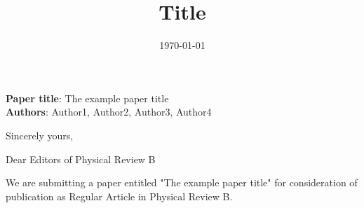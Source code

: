 \documentclass[12pt,a4paper, roman]{moderncv}
\title{Title}                               %
\begin{document}
\date{\today}
\opening{\textbf{Paper title}: The example paper title \\
\textbf{Authors}: Author1, Author2, Author3, Author4}

\closing{Sincerely yours,}

\makelettertitle
% 
Dear Editors of Physical Review B

\vspace{0.5cm}

We are submitting a paper entitled "The example paper title" for consideration of publication as Regular Article in Physical Review B. 

\vspace{0.2cm}

\lipsum[10] %

\vspace{0.2cm}

\lipsum[10] %

\vspace{0.2cm}

\lipsum[10] %

\vspace{0.3cm}

\makeletterclosing
\end{document}
